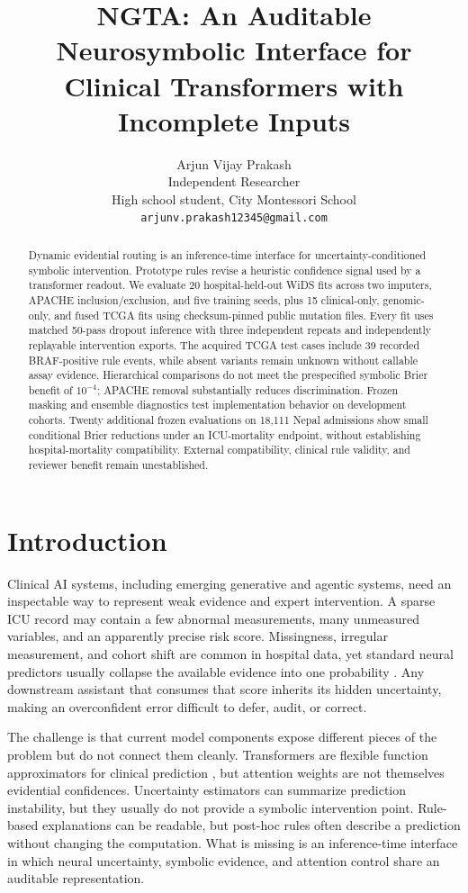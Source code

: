 \documentclass{article}
\title{NGTA: An Auditable Neurosymbolic Interface for Clinical Transformers with Incomplete Inputs}
\author{Arjun Vijay Prakash \\
Independent Researcher \\
High school student, City Montessori School \\
\texttt{arjunv.prakash12345@gmail.com}}
\date{}
\begin{document}
\maketitle

\begin{abstract}
Dynamic evidential routing is an inference-time interface for uncertainty-conditioned symbolic intervention. Prototype rules revise a heuristic confidence signal used by a transformer readout. We evaluate 20 hospital-held-out WiDS fits across two imputers, APACHE inclusion/exclusion, and five training seeds, plus 15 clinical-only, genomic-only, and fused TCGA fits using checksum-pinned public mutation files. Every fit uses matched 50-pass dropout inference with three independent repeats and independently replayable intervention exports. The acquired TCGA test cases include 39 recorded BRAF-positive rule events, while absent variants remain unknown without callable assay evidence. Hierarchical comparisons do not meet the prespecified symbolic Brier benefit of $10^{-4}$; APACHE removal substantially reduces discrimination. Frozen masking and ensemble diagnostics test implementation behavior on development cohorts. Twenty additional frozen evaluations on 18,111 Nepal admissions show small conditional Brier reductions under an ICU-mortality endpoint, without establishing hospital-mortality compatibility. External compatibility, clinical rule validity, and reviewer benefit remain unestablished.
\end{abstract}

\section{Introduction}
\label{sec:intro}

Clinical AI systems, including emerging generative and agentic systems, need an inspectable way to represent weak evidence and expert intervention. A sparse ICU record may contain a few abnormal measurements, many unmeasured variables, and an apparently precise risk score. Missingness, irregular measurement, and cohort shift are common in hospital data, yet standard neural predictors usually collapse the available evidence into one probability \citep{ma2019,ovadia2019,ghassemi2021}. Any downstream assistant that consumes that score inherits its hidden uncertainty, making an overconfident error difficult to defer, audit, or correct.

The challenge is that current model components expose different pieces of the problem but do not connect them cleanly. Transformers are flexible function approximators for clinical prediction \citep{rasmy2021,azizi2021,li2019}, but attention weights are not themselves evidential confidences. Uncertainty estimators can summarize prediction instability, but they usually do not provide a symbolic intervention point. Rule-based explanations can be readable, but post-hoc rules often describe a prediction without changing the computation. What is missing is an inference-time interface in which neural uncertainty, symbolic evidence, and attention control share an auditable representation.
\end{document}
